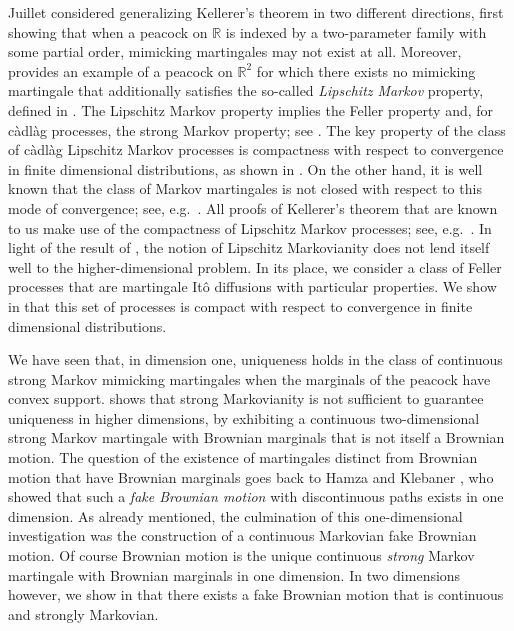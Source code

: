 \documentclass[12pt,oneside]{amsart}
\theoremstyle{definition}
\newcommand{\R}{\mathbb R}
\def\R{{\mathbb R}}
\numberwithin{equation}{section}
\begin{document}
Juillet \cite{Ju16} considered generalizing Kellerer's theorem in two different directions, first showing that when a peacock on $\R$ is indexed by a two-parameter family with some partial order, mimicking martingales may not exist at all. Moreover, \cite{Ju16} provides an example of a peacock on $\R^2$ for which there exists no mimicking martingale that additionally satisfies the so-called \emph{Lipschitz Markov} property, defined in \cite[Definition 6]{Ju16}. The Lipschitz Markov property implies the Feller property and, for c\`adl\`ag processes, the strong Markov property; see \cite[Lemma 4.2]{Lo09}. The key property of the class of c\`adl\`ag Lipschitz Markov processes is compactness with respect to convergence in finite dimensional distributions, as shown in \cite[Lemma 4.5]{Lo09}. On the other hand, it is well known that the class of Markov martingales is not closed with respect to this mode of convergence; see, e.g.~\cite[Example 1]{BeHuSt16}. All proofs of Kellerer's theorem that are known to us make use of the compactness of Lipschitz Markov processes; see, e.g.~\cite{BeHuSt16,HiRoYo14,Ke72,Lo09}. In light of the result of \cite{Ju16}, the notion of Lipschitz Markovianity does not lend itself well to the higher-dimensional problem. In its place, we consider a class of Feller processes that are martingale It\^o diffusions with particular properties. We show in  that this set of processes is compact with respect to convergence in finite dimensional distributions.

We have seen that, in dimension one, uniqueness holds in the class of continuous strong Markov mimicking martingales when the marginals of the peacock have convex support.  shows that strong Markovianity is not sufficient to guarantee uniqueness in higher dimensions, by exhibiting a continuous two-dimensional strong Markov martingale with Brownian marginals that is not itself a Brownian motion. The question of the existence of martingales distinct from Brownian motion that have Brownian marginals goes back to Hamza and Klebaner \cite{HaKl07}, who showed that such a \emph{fake Brownian motion} with discontinuous paths exists in one dimension. As already mentioned, the culmination of this one-dimensional investigation was the construction \cite{BePaSc21a} of a continuous Markovian fake Brownian motion. Of course Brownian motion is the unique continuous \emph{strong} Markov martingale with Brownian marginals in one dimension. In two dimensions however, we show in  that there exists a fake Brownian motion that is continuous and strongly Markovian.
\end{document}
